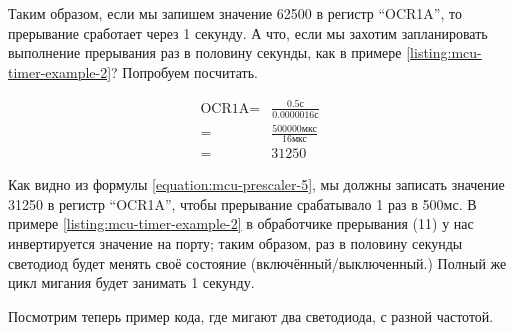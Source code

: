 \documentclass[../sparc.tex]{subfiles}
\begin{document}
Таким образом, если мы запишем значение 62500 в регистр ``OCR1A'', то прерывание
сработает через 1 секунду.  А что, если мы захотим запланировать выполнение
прерывания раз в половину секунды, как в примере
\ref{listing:mcu-timer-example-2}?  Попробуем посчитать.

\begin{align}
  \mbox{OCR1A} =& \frac{0.5\mbox{с}}{0.0000016\mbox{с}} \nonumber \\
  =& \frac{500000\mbox{мкс}}{16\mbox{мкс}} \nonumber \\
  =& 31250
  \label{equation:mcu-prescaler-5}
\end{align}

Как видно из формулы \ref{equation:mcu-prescaler-5}, мы должны записать значение
31250 в регистр ``OCR1A'', чтобы прерывание срабатывало 1 раз в 500мс.  В
примере \ref{listing:mcu-timer-example-2} в обработчике прерывания (11) у нас
инвертируется значение на порту; таким образом, раз в половину секунды светодиод
будет менять своё состояние (включённый/выключенный.)  Полный же цикл мигания
будет занимать 1 секунду.

Посмотрим теперь пример кода, где мигают два светодиода, с разной частотой.
\end{document}
